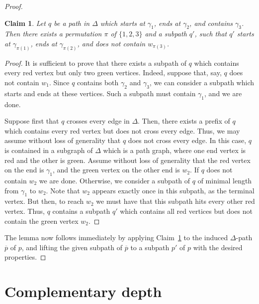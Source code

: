 \documentclass[11pt,a4paper]{amsart}
\newtheorem{claim}[theorem]{Claim}
\theoremstyle{definition}
\begin{document}
\begin{proof}
    \begin{claim}\label{claim:subpath-delta-weak}
        Let $q$ be a path in $\Delta$ which starts at $\gamma_1$, ends at $\gamma_2$, and contains $\gamma_3$. Then there exists a permutation $\pi$ of $\{1,2,3\}$ and a subpath $q'$, such that $q'$ starts at $\gamma_{\pi(1)}$, ends at $\gamma_{\pi(2)}$, and  does not contain $w_{\pi(3)}$. 
    \end{claim}

    \begin{proof}
        It is sufficient to prove that there exists a subpath of $q$ which contains every red vertex but only two green vertices. 
        Indeed, suppose that, say, $q$ does not contain $w_1$. Since $q$ contains both $\gamma_2$ and $\gamma_3$, we can consider a subpath which starts and ends at these vertices. Such a subpath must contain $\gamma_1$, and we are done.

        
        Suppose first that $q$ crosses every edge in $\Delta$. Then, there exists a prefix of $q$ which contains every red vertex but does not cross every edge. 
        Thus, we may assume without loss of generality that $q$ does not cross every edge. 
        In this case, $q$ is contained in a subgraph of $\Delta$ which is a path graph, where one end vertex is red and the other is green. Assume without loss of generality that the red vertex on the end is $\gamma_1$, and the green vertex on the other end is $w_2$. If $q$ does not contain $w_2$ we are done. Otherwise, we consider a subpath of $q$ of minimal length from $\gamma_1$ to $w_2$. Note that $w_2$ appears exactly once in this subpath, as the terminal vertex. But then, to reach $w_2$ we must have that this subpath hits every other red vertex. Thus, $q$ contains a subpath $q'$ which contains all red vertices but does not contain the green vertex $w_2$. 
    \end{proof}

    The lemma now follows immediately by applying Claim~\ref{claim:subpath-delta-weak} to the induced $\Delta$-path $\overline p$ of $p$, and lifting the given subpath of $\overline p$ to a subpath $p'$ of $p$ with the desired properties. 
\end{proof}






\section{Complementary depth}\label{sec:complementary depth}
\end{document}
